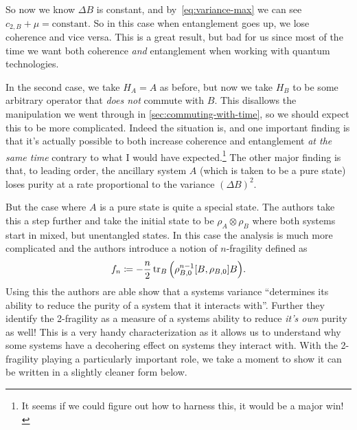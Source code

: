 \documentclass[11pt,english]{article}
\theoremstyle{definition}
\newcommand{\twonormE}[1][\rho]{c_{2,B}}
\begin{document}
So now we know $\Delta B$ is constant, and by~\cref{eq:variance-max} we can see $\twonormE + \mu = \text{constant}$. So in this case when entanglement goes up, we lose coherence and vice versa. This is a great result, but bad for us since most of the time we want both coherence \emph{and} entanglement when working with quantum technologies.

In the second case, we take $H_A = A$ as before, but now we take $H_B$ to be some arbitrary operator that \emph{does not} commute with $B$. This disallows the manipulation we went through in \cref{sec:commuting-with-time}, so we should expect this to be more complicated. Indeed the situation is, and one important finding is that it's actually possible to both increase coherence and entanglement \emph{at the same time} contrary to what I would have expected.\footnote{It seems if we could figure out how to harness this, it would be a major win!} The other major finding is that, to leading order, the ancillary system $A$ (which is taken to be a pure state) loses purity at a rate proportional to the variance $(\Delta B)^2$.

But the case where $A$ is a pure state is quite a special state. The authors take this a step further and take the initial state to be $\rho_A\otimes \rho_B$ where both systems start in mixed, but unentangled states. In this case the analysis is much more complicated and the authors introduce a notion of $n$-fragility defined as
\begin{equation*}
	f_n\coloneqq -\frac{n}{2}\tr_B\qty(\rho_{B,0}^{n-1}\comm{B}{\rho_{B,0}}B).
\end{equation*}
Using this the authors are able show that a systems variance ``determines its ability to reduce the purity of a system that it interacts with''. Further they identify the 2-fragility as a measure of a systems ability to reduce \emph{it's own} purity as well! This is a very handy characterization as it allows us to understand why some systems have a decohering effect on systems they interact with. With the 2-fragility playing a particularly important role, we take a moment to show it can be written in a slightly cleaner form below.
\end{document}
